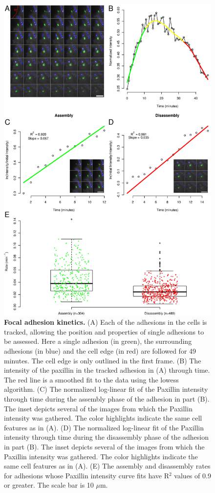 \begin{figure}[htbp]
\begin{center}
\includegraphics[height=0.8\textheight]{../figures/kinetics/kinetics}
\end{center}
\caption{
{\bf Focal adhesion kinetics.} (A) Each of the adhesions in the cells is
tracked, allowing the position and properties of single adhesions to be
assessed. Here a single adhesion (in green), the surrounding adhesions (in blue)
and the cell edge (in red) are followed for 49 minutes. The cell edge is only
outlined in the first frame. (B) The intensity of the paxillin in the tracked
adhesion in (A) through time. The red line is a smoothed fit to the data using
the lowess algorithm. (C) The normalized log-linear fit of the Paxillin
intensity through time during the assembly phase of the adhesion in part (B).
The inset depicts several of the images from which the Paxillin intensity was
gathered. The color highlights indicate the same cell features as in (A). (D)
The normalized log-linear fit of the Paxillin intensity through time during the
disassembly phase of the adhesion in part (B). The inset depicts several of the
images from which the Paxillin intensity was gathered. The color highlights
indicate the same cell features as in (A). (E) The assembly and disassembly
rates for adhesions whose Paxillin intensity curve fits have R$^2$ values of 0.9
or greater. The scale bar is 10 $\mu$m.
}
\label{kinetics}
\end{figure}

